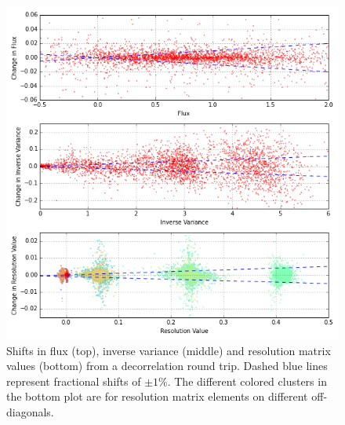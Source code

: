 \documentclass[12pt]{article}
\begin{document}
\begin{figure}[htb]
\begin{center}
\includegraphics[width=5in]{fig/roundtrip}
\caption{Shifts in flux (top), inverse variance (middle) and resolution matrix values (bottom) from a decorrelation round trip. Dashed blue lines represent fractional shifts of $\pm 1$\%. The different colored clusters in the bottom plot are for resolution matrix elements on different off-diagonals.}
\label{fig:roundtrip}
\end{center}
\end{figure}

\def\apjl{ApJL} %
\def\aj{AJ} %
\def\apj{ApJ} %
\def\pasp{PASP} %
\def\spie{SPIE} %
\def\apjs{ApJS} %
\def\araa{ARAA} %
\def\aap{A\&A} %
\def\aaps{A\&A~Supl.} %
\def\nat{Nature} %
\def\nar{New Astron. Rev.} %
\def\mnras{MNRAS} %
\def\jcap{JCAP} %
\def\prd{{Phys.~Rev.~D}}        %
\def\physrep{{Phys.~Reports}} %



\end{document}
